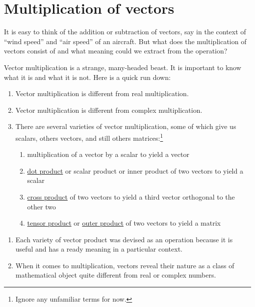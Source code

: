 \documentclass[
  a4paper,
]{article}
\providecommand{\tightlist}{%
  \setlength{\itemsep}{0pt}\setlength{\parskip}{0pt}}
\begin{document}
\hypertarget{multiplication-of-vectors}{%
\section{Multiplication of vectors}\label{multiplication-of-vectors}}

It is easy to think of the addition or subtraction of vectors, say in
the context of ``wind speed'' and ``air speed'' of an aircraft. But what
does the multiplication of vectors consist of and what meaning could we
extract from the operation?

Vector multiplication is a strange, many-headed beast. It is important
to know what it is and what it is not. Here is a quick run down:

\begin{enumerate}
\def\labelenumi{\arabic{enumi}.}
\item
  Vector multiplication is different from real multiplication.
\item
  Vector multiplication is different from complex multiplication.
\item
  There are several varieties of vector multiplication, some of which
  give us scalars, others vectors, and still others matrices:\footnote{Ignore
    any unfamiliar terms for now.}

  \begin{enumerate}
  \def\labelenumii{(\alph{enumii})}
  \tightlist
  \item
    multiplication of a vector by a scalar to yield a vector
  \item
    \href{http://mathworld.wolfram.com/DotProduct.html}{dot product} or
    scalar product or inner product of two vectors to yield a scalar
  \item
    \href{http://mathworld.wolfram.com/CrossProduct.html}{cross product}
    of two vectors to yield a third vector orthogonal to the other two
  \item
    \href{http://en.wikipedia.org/wiki/Tensor_product}{tensor product}
    or \href{http://en.wikipedia.org/wiki/Outer_product}{outer product}
    of two vectors to yield a matrix
  \end{enumerate}
\end{enumerate}

\begin{enumerate}
\def\labelenumi{\arabic{enumi}.}
\setcounter{enumi}{3}
\item
  Each variety of vector product was devised as an operation because it
  is useful and has a ready meaning in a particular context.
\item
  When it comes to multiplication, vectors reveal their nature as a
  class of mathematical object quite different from real or complex
  numbers.
\end{enumerate}
\end{document}
